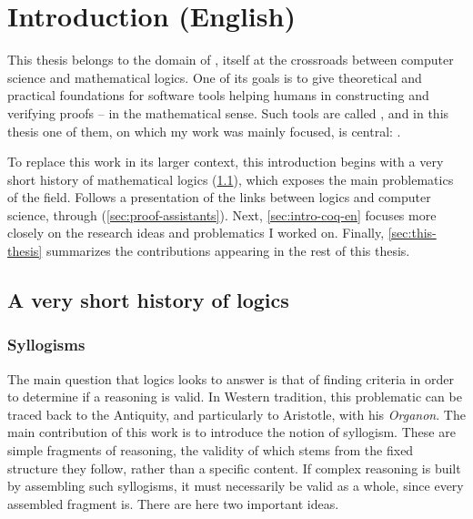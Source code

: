 \chapter{Introduction (English)}
\label{chap:intro-en}

\margintoc

This thesis belongs to the domain of , itself
at the crossroads between computer science and mathematical logics.
One of its goals is to give theoretical and practical foundations
for software tools helping humans in constructing and verifying proofs –
in the mathematical sense.
Such tools are called , and in this thesis one of them, on
which my work was mainly focused, is central: .

To replace this work in its larger context, this introduction begins with a very
short history of mathematical logics (\cref{sec:logic-history}), which exposes the
main problematics of the field. Follows a presentation of the links between logics and
computer science, through  (\cref{sec:proof-assistants}).
Next, \cref{sec:intro-coq-en} focuses more closely on the research ideas and problematics
I worked on.
Finally, \cref{sec:this-thesis} summarizes the contributions appearing in the rest of
this thesis.

\section{A very short history of logics}
\label{sec:logic-history}

\subsection{Syllogisms}

The main question that logics looks to answer is that of finding criteria in order to determine
if a reasoning is valid. In Western tradition, this problematic can be traced back to the
Antiquity, and particularly to Aristotle, with his \textit{Organon}.
The main contribution of this work is to introduce the notion of syllogism.
These are simple fragments of reasoning, the validity of which stems from the
fixed structure they follow, rather than a specific content.%
If complex reasoning is built by assembling such syllogisms, it must necessarily be valid as
a whole, since every assembled fragment is. There are here two important ideas.

